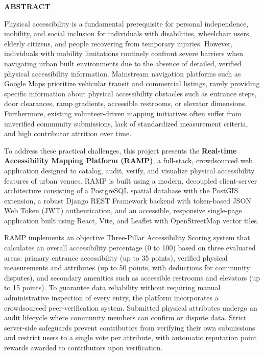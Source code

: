 \documentclass[12pt,a4paper]{report}
\begin{document}
\newpage
\begin{center}
    {\Large \textbf{ABSTRACT}\par}
\end{center}
\vspace{0.8cm}

\noindent Physical accessibility is a fundamental prerequisite for personal independence, mobility, and social inclusion for individuals with disabilities, wheelchair users, elderly citizens, and people recovering from temporary injuries. However, individuals with mobility limitations routinely confront severe barriers when navigating urban built environments due to the absence of detailed, verified physical accessibility information. Mainstream navigation platforms such as Google Maps prioritize vehicular transit and commercial listings, rarely providing specific information about physical accessibility obstacles such as entrance steps, door clearances, ramp gradients, accessible restrooms, or elevator dimensions. Furthermore, existing volunteer-driven mapping initiatives often suffer from unverified community submissions, lack of standardized measurement criteria, and high contributor attrition over time.

\vspace{0.4cm}
\noindent To address these practical challenges, this project presents the \textbf{Real-time Accessibility Mapping Platform (RAMP)}, a full-stack, crowdsourced web application designed to catalog, audit, verify, and visualize physical accessibility features of urban venues. RAMP is built using a modern, decoupled client-server architecture consisting of a PostgreSQL spatial database with the PostGIS extension, a robust Django REST Framework backend with token-based JSON Web Token (JWT) authentication, and an accessible, responsive single-page application built using React, Vite, and Leaflet with OpenStreetMap vector tiles.

\vspace{0.4cm}
\noindent RAMP implements an objective Three-Pillar Accessibility Scoring system that calculates an overall accessibility percentage (0 to 100) based on three evaluated areas: primary entrance accessibility (up to 35 points), verified physical measurements and attributes (up to 50 points, with deductions for community disputes), and secondary amenities such as accessible restrooms and elevators (up to 15 points). To guarantee data reliability without requiring manual administrative inspection of every entry, the platform incorporates a crowdsourced peer-verification system. Submitted physical attributes undergo an audit lifecycle where community members can confirm or dispute data. Strict server-side safeguards prevent contributors from verifying their own submissions and restrict users to a single vote per attribute, with automatic reputation point rewards awarded to contributors upon verification.
\end{document}
